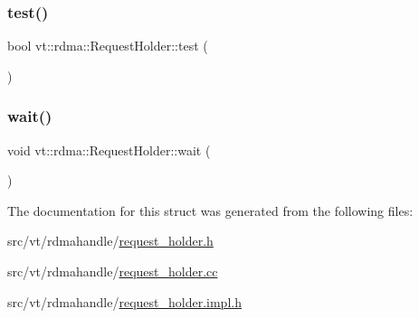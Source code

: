 \mbox{\label{structvt_1_1rdma_1_1_request_holder_ae363ac2a5fcee1fed9fc1d9393d69981}} 
\subsubsection{\texorpdfstring{test()}{test()}}
{\footnotesize\ttfamily bool vt\+::rdma\+::\+Request\+Holder\+::test (\begin{DoxyParamCaption}{ }\end{DoxyParamCaption})}

\mbox{\label{structvt_1_1rdma_1_1_request_holder_ac39a770edd579e49cf95f5238e5aabb6}} 
\subsubsection{\texorpdfstring{wait()}{wait()}}
{\footnotesize\ttfamily void vt\+::rdma\+::\+Request\+Holder\+::wait (\begin{DoxyParamCaption}{ }\end{DoxyParamCaption})}



The documentation for this struct was generated from the following files\+:\begin{DoxyCompactItemize}
\item 
src/vt/rdmahandle/\hyperlink{request__holder_8h}{request\+\_\+holder.\+h}\item 
src/vt/rdmahandle/\hyperlink{request__holder_8cc}{request\+\_\+holder.\+cc}\item 
src/vt/rdmahandle/\hyperlink{request__holder_8impl_8h}{request\+\_\+holder.\+impl.\+h}\end{DoxyCompactItemize}
